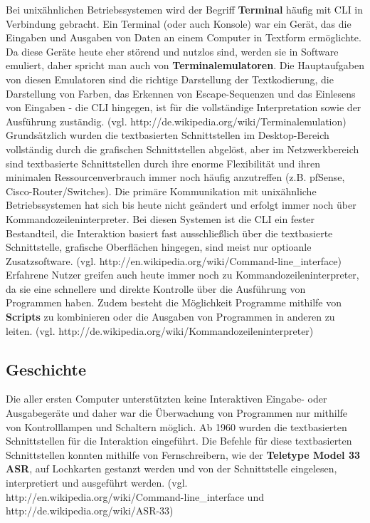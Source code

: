 \documentclass[12pt,a4paper]{report}
\begin{document}
\begin{onehalfspace}
Bei unixähnlichen Betriebssystemen wird der Begriff \textbf{Terminal} häufig mit CLI in Verbindung gebracht. Ein Terminal (oder auch Konsole) war ein Gerät, das die Eingaben und Ausgaben von Daten an einem Computer in Textform ermöglichte. Da diese Geräte heute eher störend und nutzlos sind, werden sie in Software emuliert, daher spricht man auch von \textbf{Terminalemulatoren}. Die Hauptaufgaben von diesen Emulatoren sind die richtige Darstellung der Textkodierung, die Darstellung von Farben, das Erkennen von Escape-Sequenzen und das Einlesens von Eingaben - die CLI hingegen, ist für die vollständige Interpretation sowie der Ausführung zuständig. (vgl. http://de.wikipedia.org/wiki/Terminalemulation)\\

Grundsätzlich wurden die textbasierten Schnittstellen im Desktop-Bereich vollständig durch die grafischen Schnittstellen abgelöst, aber im Netzwerkbereich sind textbasierte Schnittstellen durch ihre enorme Flexibilität und ihren minimalen Ressourcenverbrauch immer noch häufig anzutreffen (z.B. pfSense, Cisco-Router/Switches). Die primäre Kommunikation mit unixähnliche Betriebssystemen hat sich bis heute nicht geändert und erfolgt immer noch über Kommandozeileninterpreter. Bei diesen Systemen ist die CLI ein fester Bestandteil, die Interaktion basiert fast ausschließlich über die textbasierte Schnittstelle, grafische Oberflächen hingegen, sind meist nur optioanle Zusatzsoftware. (vgl. http://en.wikipedia.org/wiki/Command-line\_interface)\\ 

Erfahrene Nutzer greifen auch heute immer noch zu Kommandozeileninterpreter, da sie eine schnellere und direkte Kontrolle über die Ausführung von Programmen haben. Zudem besteht die Möglichkeit Programme mithilfe von \textbf{Scripts} zu kombinieren oder die Ausgaben von Programmen in anderen zu leiten. (vgl. http://de.wikipedia.org/wiki/Kommandozeileninterpreter)

\subsection{Geschichte}

Die aller ersten Computer unterstützten keine Interaktiven Eingabe- oder Ausgabegeräte und daher war die Überwachung von Programmen nur mithilfe von Kontrolllampen und Schaltern möglich. Ab 1960 wurden die textbasierten Schnittstellen für die Interaktion eingeführt. Die Befehle für diese textbasierten Schnittstellen konnten mithilfe von Fernschreibern, wie der \textbf{Teletype Model 33 ASR}, auf Lochkarten gestanzt werden und von der Schnittstelle eingelesen, interpretiert und ausgeführt werden. (vgl. http://en.wikipedia.org/wiki/Command-line\_interface und http://de.wikipedia.org/wiki/ASR-33) \\


\end{onehalfspace}
\end{document}
